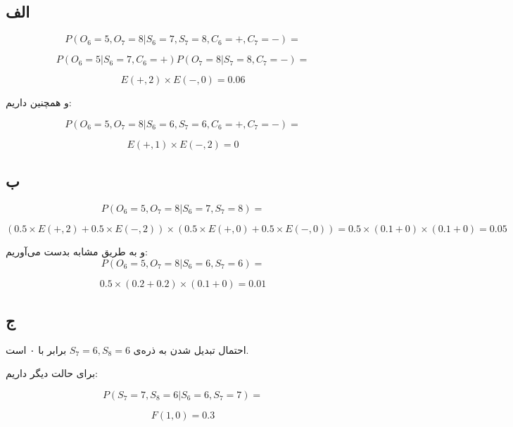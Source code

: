 \subsection*{الف}

$$
P(O_6 = 5 , O_7 = 8 | S_6 = 7 , S_7 = 8 , C_6 = + , C_7 = -) = 
$$

$$
P(O_6 = 5 | S_6 = 7 , C_6 = +) P(O_7 = 8 | S_7 = 8 , C_7 = -) =
$$

$$
E(+ , 2) \times E(- , 0) = 0.06
$$

و همچنین داریم:

$$
P(O_6 = 5 , O_7 = 8 | S_6 = 6 , S_7 = 6 , C_6 = + , C_7 = -) = 
$$

$$
E(+ , 1) \times E(- , 2) = 0
$$

\subsection*{ب}

$$
P(O_6 = 5 , O_7 = 8 | S_6 = 7 , S_7 = 8) =
$$

$$
(0.5 \times E(+ , 2) + 0.5 \times E(- , 2)) \times (0.5 \times E(+ , 0) + 0.5 \times E(- , 0)) = 0.5 \times (0.1 + 0)	\times (0.1 + 0) = 0.05
$$
 
 و به طریق مشابه بدست می‌آوریم:
$$
P(O_6 = 5 , O_7 = 8 | S_6 = 6 , S_7 = 6) =
$$

$$
0.5 \times (0.2 + 0.2) \times (0.1 + 0) = 0.01
$$

\subsection*{ج}

احتمال تبدیل شدن به ذره‌ی 
$S_7 = 6 , S_8 = 6$
برابر با ۰ است.

برای حالت دیگر داریم:

$$
P(S_7 = 7 , S_8 = 6 | S_6 = 6 , S_7 = 7) =
$$

$$
F(1 , 0) = 0.3
$$

